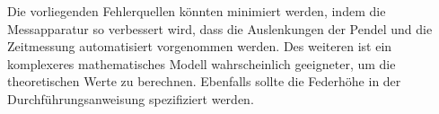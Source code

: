 Die vorliegenden Fehlerquellen könnten minimiert werden, indem die Messapparatur so verbessert wird, dass die Auslenkungen der Pendel
und die Zeitmessung automatisiert vorgenommen werden. Des weiteren ist ein komplexeres mathematisches Modell wahrscheinlich geeigneter,
um die theoretischen Werte zu berechnen. Ebenfalls sollte die Federhöhe in der Durchführungsanweisung spezifiziert werden.
